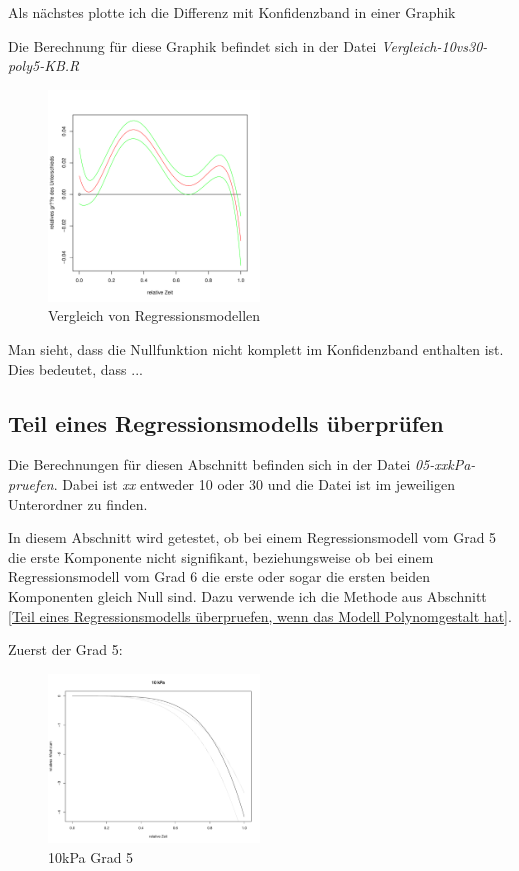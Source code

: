 \documentclass[12pt,a4paper]{article}
\theoremstyle{definition}
\theoremstyle{definition}
\theoremstyle{definition}
\begin{document}
Als nächstes plotte ich die Differenz mit Konfidenzband in einer Graphik

Die Berechnung für diese Graphik befindet sich in der Datei \textit{Vergleich-10vs30-poly5-KB.R}

\begin{figure}[H] 
  \centering
     \includegraphics[width=0.5\textwidth]{Vergleich-10vs30kPa-poly5-KB}
  \caption{Vergleich von Regressionsmodellen}
  \label{fig:10}
\end{figure}

Man sieht, dass die Nullfunktion nicht komplett im Konfidenzband enthalten ist. Dies bedeutet, dass ...


\subsection{Teil eines Regressionsmodells überprüfen}
Die Berechnungen für diesen Abschnitt befinden sich in der Datei \textit{05-xxkPa-pruefen}. Dabei ist \textit{xx} entweder 10 oder 30 und die Datei ist im jeweiligen Unterordner zu finden.

In diesem Abschnitt wird getestet, ob bei einem Regressionsmodell vom Grad 5 die erste Komponente nicht signifikant, beziehungsweise ob bei einem Regressionsmodell vom Grad 6 die erste oder sogar die ersten beiden Komponenten gleich Null sind. Dazu verwende ich die Methode aus Abschnitt \ref{Teil eines Regressionsmodells überpruefen, wenn das Modell Polynomgestalt hat}.

Zuerst der Grad 5:

\begin{figure}[H] 
  \centering
     \includegraphics[width=0.5\textwidth]{10kPa-Grad-5-KB}
  \caption{10kPa Grad 5}
  \label{10kPa Grad 5}
\end{figure}
\end{document}
